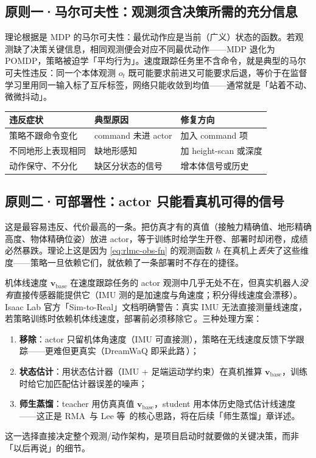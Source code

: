 \subsection{原则一·马尔可夫性：观测须含决策所需的充分信息}
\label{sec:rlmc-markov}

理论根据是 MDP 的马尔可夫性：最优动作应是当前（广义）状态的函数。若观测缺了决策关键信息，相同观测便会对应不同最优动作——MDP 退化为 POMDP，策略被迫学「平均行为」。速度跟踪任务里不含命令，就是典型的马尔可夫性违反：同一个本体观测 $o_t$ 既可能要求前进又可能要求后退，等价于在监督学习里用同一输入标了互斥标签，网络只能收敛到均值——通常就是「站着不动、微微抖动」。

\begin{center}
\small
\begin{tabular}{@{}lll@{}}
\toprule
违反症状 & 典型原因 & 修复方向 \\
\midrule
策略不跟命令变化 & command 未进 actor & 加入 command 项 \\
不同地形上表现相同 & 缺地形感知 & 加 height-scan 或深度 \\
动作保守、不分化 & 缺区分状态的信号 & 增本体信号或历史 \\
\bottomrule
\end{tabular}
\end{center}

\subsection{原则二·可部署性：actor 只能看真机可得的信号}
\label{sec:rlmc-deployable}

这是最容易违反、代价最高的一条。把仿真才有的真值（接触力精确值、地形精确高度、物体精确位姿）放进 actor，等于训练时给学生开卷、部署时却闭卷，成绩必然暴跌。理论上这是因为 \cref{eq:rlmc-obs-fn} 的观测函数 $h$ 在真机上\emph{丢失}了这些维度——策略一旦依赖它们，就依赖了一条部署时不存在的捷径。

\begin{insight}\label{ins:rlmc-baselin}
机体线速度 $\mathbf v_{\text{base}}$ 在速度跟踪任务的 actor 观测中几乎无处不在，但真实机器人\emph{没有}直接传感器能提供它（IMU 测的是加速度与角速度；积分得线速度会漂移）。Isaac Lab 官方「Sim-to-Real」文档明确警告：真实 IMU 无法直接测量线速度，若策略训练时依赖机体线速度，部署前必须移除它\,\cite{isaaclab2024sim2real}。三种处理方案：
\begin{enumerate}
  \item \textbf{移除}：actor 只留机体角速度（IMU 可直接测），策略在无线速度反馈下学跟踪——更难但更真实（DreamWaQ 即采此路\,\cite{nahrendra2023dreamwaq}）；
  \item \textbf{状态估计}：用状态估计器（IMU + 足端运动学约束）在真机推算 $\mathbf v_{\text{base}}$，训练时给它加匹配估计器误差的噪声；
  \item \textbf{师生蒸馏}：teacher 用仿真真值 $\mathbf v_{\text{base}}$，student 用本体历史隐式估计线速度——这正是 RMA\,\cite{kumar2021rma} 与 Lee 等\,\cite{lee2020quadruped} 的核心思路，将在后续「师生蒸馏」章详述。
\end{enumerate}
这一选择直接决定整个观测/动作架构，是项目启动时就要做的关键决策，而非「以后再说」的细节。
\end{insight}

